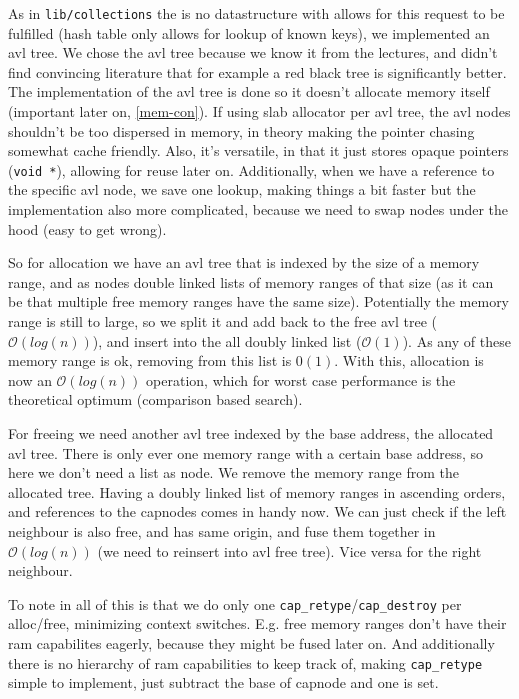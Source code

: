 As in \verb|lib/collections| the is no datastructure with allows for this
request to be fulfilled (hash table only allows for lookup of known keys), we
implemented an avl tree.
We chose the avl tree because we know it from the lectures, and didn't find
convincing literature that for example a red black tree is significantly better.
The implementation of the avl tree is done so it doesn't allocate memory itself
(important later on, \ref{mem-con}).
If using slab allocator per avl tree, the avl nodes shouldn't be too dispersed
in memory, in theory making the pointer chasing somewhat cache friendly.
Also, it's versatile, in that it just stores opaque pointers (\verb|void *|),
allowing for reuse later on.
Additionally, when we have a reference to the specific avl node, we save one
lookup, making things a bit faster but the implementation also more complicated,
because we need to swap nodes under the hood (easy to get wrong).

So for allocation we have an avl tree that is indexed by the size of a memory
range, and as nodes double linked lists of memory ranges of that size (as it
can be that multiple free memory ranges have the same size).
Potentially the memory range is still to large, so we split it and add back to
the free avl tree ($\mathcal{O}(log(n))$), and insert into the all doubly linked
list ($\mathcal{O}(1)$).
As any of these memory range is ok, removing from this list is $\mathcal{0}(1)$.
With this, allocation is now an $\mathcal{O}(log(n))$ operation, which for worst
case performance is the theoretical optimum (comparison based search).

For freeing we need another avl tree indexed by the base address, the allocated
avl tree.
There is only ever one memory range with a certain base address, so here we
don't need a list as node.
We remove the memory range from the allocated tree.
Having a doubly linked list of memory ranges in ascending orders, and references
to the capnodes comes in handy now.
We can just check if the left neighbour is also free, and has same origin, and
fuse them together in $\mathcal{O}(log(n))$ (we need to reinsert into avl free
tree).
Vice versa for the right neighbour.

To note in all of this is that we do only one
\verb|cap_retype|/\verb|cap_destroy| per alloc/free, minimizing context
switches.
E.g. free memory ranges don't have their ram capabilites eagerly, because they
might be fused later on.
And additionally there is no hierarchy of ram capabilities to keep track of,
making \verb|cap_retype| simple to implement, just subtract the base of capnode
and one is set.

